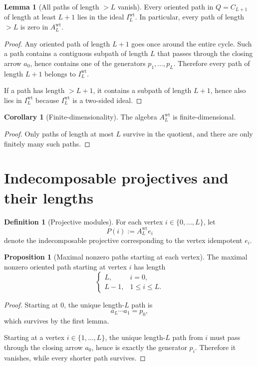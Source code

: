\documentclass{article}
\theoremstyle{definition}
\newtheorem{proposition}[theorem]{Proposition}
\newtheorem{lemma}[theorem]{Lemma}
\newtheorem{corollary}[theorem]{Corollary}
\newtheorem{definition}[theorem]{Definition}
\begin{document}
\begin{lemma}[All paths of length $>L$ vanish]
Every oriented path in $Q=C_{L+1}$ of length at least $L+1$ lies in the ideal
$I_L^{\mathrm{wt}}$.
In particular, every path of length $>L$ is zero in $A_L^{\mathrm{wt}}$.
\end{lemma}

\begin{proof}
Any oriented path of length $L+1$ goes once around the entire cycle. Such a path
contains a contiguous subpath of length $L$ that passes through the closing
arrow $a_0$, hence contains one of the generators $p_1,\dots,p_L$.
Therefore every path of length $L+1$ belongs to $I_L^{\mathrm{wt}}$.

If a path has length $>L+1$, it contains a subpath of length $L+1$, hence also
lies in $I_L^{\mathrm{wt}}$ because $I_L^{\mathrm{wt}}$ is a two-sided ideal.
\end{proof}

\begin{corollary}[Finite-dimensionality]
The algebra $A_L^{\mathrm{wt}}$ is finite-dimensional.
\end{corollary}

\begin{proof}
Only paths of length at most $L$ survive in the quotient, and there are only
finitely many such paths.
\end{proof}

\section{Indecomposable projectives and their lengths}

\begin{definition}[Projective modules]
For each vertex $i\in\{0,\dots,L\}$, let
\[
P(i):=A_L^{\mathrm{wt}}e_i
\]
denote the indecomposable projective corresponding to the vertex idempotent
$e_i$.
\end{definition}

\begin{proposition}[Maximal nonzero paths starting at each vertex]
The maximal nonzero oriented path starting at vertex $i$ has length
\[
\begin{cases}
L, & i=0,\\
L-1, & 1\le i\le L.
\end{cases}
\]
\end{proposition}

\begin{proof}
Starting at $0$, the unique length-$L$ path is
\[
a_L\cdots a_1=p_0,
\]
which survives by the first lemma.

Starting at a vertex $i\in\{1,\dots,L\}$, the unique length-$L$ path from $i$
must pass through the closing arrow $a_0$, hence is exactly the generator
$p_i$. Therefore it vanishes, while every shorter path survives.
\end{proof}
\end{document}
